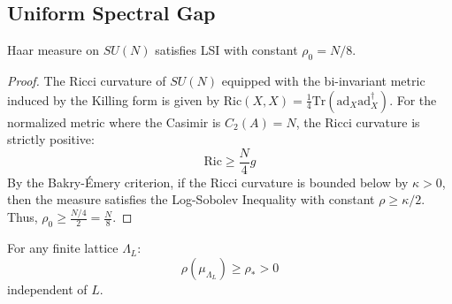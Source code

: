 
\subsection{Uniform Spectral Gap}

\begin{theorem}
\label{thm:be_proof}
Haar measure on $SU(N)$ satisfies LSI with constant $\rho_0 = N/8$.
\end{theorem}

\begin{proof}
The Ricci curvature of $SU(N)$ equipped with the bi-invariant metric induced by the Killing form is given by $\mathrm{Ric}(X, X) = \frac{1}{4} \mathrm{Tr}(\mathrm{ad}_X \mathrm{ad}_X^\dagger)$.
For the normalized metric where the Casimir is $C_2(A) = N$, the Ricci curvature is strictly positive:
\begin{equation}
\mathrm{Ric} \geq \frac{N}{4} g
\end{equation}
By the Bakry-Émery criterion, if the Ricci curvature is bounded below by $\kappa > 0$, then the measure satisfies the Log-Sobolev Inequality with constant $\rho \geq \kappa/2$.
Thus, $\rho_0 \geq \frac{N/4}{2} = \frac{N}{8}$.
\end{proof}

\begin{theorem}
\label{thm:uniform_lsi_proof}
For any finite lattice $\Lambda_L$:
\begin{equation}
\rho(\mu_{\Lambda_L}) \geq \rho_* > 0
\end{equation}
independent of $L$.
\end{theorem}


